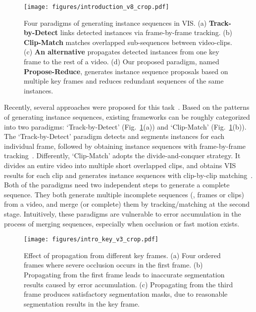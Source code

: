 \documentclass[10pt,twocolumn,letterpaper]{article}
\begin{document}
	\begin{figure}[t]
		\begin{center}
			\texttt{[image: figures/introduction\_v8\_crop.pdf]}
		\end{center}
		\caption{Four paradigms of generating instance sequences in VIS.
			(a) \textbf{Track-by-Detect} links detected instances via frame-by-frame tracking.
			(b) \textbf{Clip-Match} matches overlapped sub-sequences between video-clips.
			(c) \textbf{An alternative} propagates detected instances from one key frame to the rest of a video.
			(d) Our proposed paradigm, named \textbf{Propose-Reduce}, generates instance sequence proposals based on multiple key frames and reduces redundant sequences of the same instances.} 
		\label{fig:paradigm}
	\end{figure}
	
	Recently, several approaches were proposed for this task~\cite{yang2019vis,cao2020sipmask,athar2020stem,bertasius2020maskprop,luiten2020unovost}. Based on the patterns of generating instance sequences, existing frameworks can be roughly categorized into two paradigms: `Track-by-Detect' (Fig.~\ref{fig:paradigm}(a))  and `Clip-Match' (Fig.~\ref{fig:paradigm}(b)). 
	The `Track-by-Detect' paradigm detects and segments instances for each individual frame, followed by obtaining instance sequences with frame-by-frame tracking~\cite{yang2019vis,cao2020sipmask}. 
	Differently, `Clip-Match' adopts the divide-and-conquer strategy. It divides an entire video into multiple short overlapped clips, and obtains VIS results for each clip and generates instance sequences with clip-by-clip matching~\cite{bertasius2020maskprop,athar2020stem}.
	Both of the paradigms need two independent steps to generate a complete sequence.
	They both generate multiple incomplete sequences (\ie, frames or clips) from a video, and merge (or complete) them by tracking/matching at the second stage. Intuitively, these paradigms are vulnerable to error accumulation in the process of merging sequences, especially when occlusion or fast motion exists.
	
	\begin{figure}[t]
		\begin{center}
			\texttt{[image: figures/intro\_key\_v3\_crop.pdf]}
		\end{center}
		\caption{Effect of propagation from different key frames.
			(a) Four ordered frames where severe occlusion occurs in the first frame.
			(b) Propagating from the first frame leads to inaccurate segmentation results caused by error accumulation.
			(c) Propagating from the third frame produces satisfactory segmentation masks, due to reasonable segmentation results in the key frame.
		}
		\label{fig:key}
	\end{figure}
	
\end{document}
